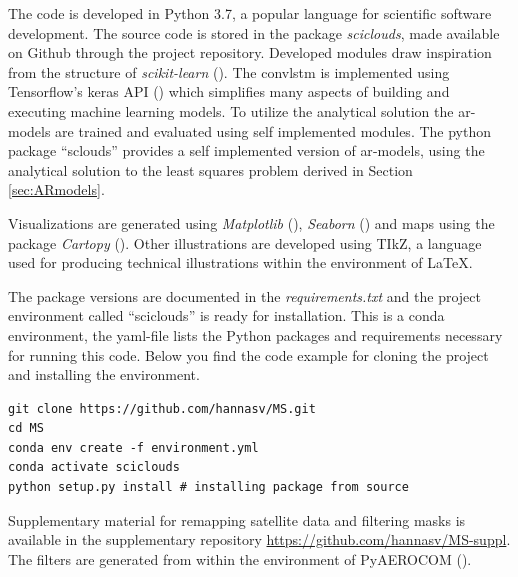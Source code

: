 The code is developed in Python 3.7, a popular language for scientific software development. The source code is stored in the package \textit{sciclouds}, made available on Github through the project repository. Developed modules draw inspiration from the structure of \textit{scikit-learn} (\cite{sklearn_api}).
The \acrshort{convlstm} is implemented using Tensorflow's keras API (\cite{tensorflow2015}) which simplifies many aspects of building and executing machine learning models. To utilize the analytical solution the \acrshort{ar}-models are trained and evaluated using self implemented modules.
The python package ``sclouds'' provides a self implemented version of \acrshort{ar}-models, using the analytical solution to the least squares problem derived in Section \ref{sec:ARmodels}.

Visualizations are generated using \textit{Matplotlib} (\cite{matplotlib}),  \textit{Seaborn} (\cite{seaborn}) and maps using the package \textit{Cartopy} (\cite{Cartopy}). Other illustrations are developed using TIkZ, a language used for producing technical illustrations within the environment of LaTeX.

The package versions are documented in the \textit{requirements.txt} and the project environment called ``sciclouds'' is ready for installation. This is a conda environment, the yaml-file lists the Python packages and requirements necessary for running this code. Below you find the code example for cloning the project and installing the environment.

\begin{verbatim}
git clone https://github.com/hannasv/MS.git
cd MS
conda env create -f environment.yml
conda activate sciclouds
python setup.py install # installing package from source
\end{verbatim}

Supplementary material for remapping satellite data and filtering masks is available in the supplementary repository \href{https://github.com/hannasv/MS-suppl}{https://github.com/hannasv/MS-suppl}. %
The filters are generated from within the environment of PyAEROCOM (\cite{pyaerocom}). 


